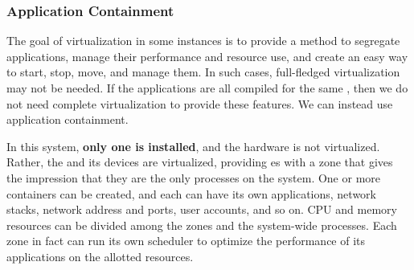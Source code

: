 \subsubsection{Application Containment}\label{subsubsec:Application_Containment}
The goal of virtualization in some instances is to provide a method to segregate applications, manage their performance and resource use, and create an easy way to start, stop, move, and manage them.
In such cases, full-fledged virtualization may not be needed.
If the applications are all compiled for the same , then we do not need complete virtualization to provide these features.
We can instead use application containment.

In this system, \textbf{only one  is installed}, and the hardware is not virtualized.
Rather, the  and its devices are virtualized, providing es with a zone that gives the impression that they are the only processes on the system.
One or more containers can be created, and each can have its own applications, network stacks, network address and ports, user accounts, and so on.
CPU and memory resources can be divided among the zones and the system-wide processes.
Each zone in fact can run its own scheduler to optimize the performance of its applications on the allotted resources.

